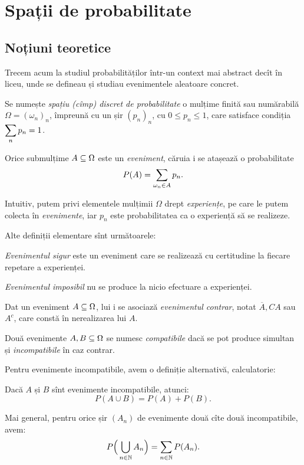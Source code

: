 
\chapter{Spații de probabilitate}

\section{Noțiuni teoretice}

\indent\indent Trecem acum la studiul probabilităților într-un context mai abstract
decît în liceu, unde se defineau și studiau evenimentele aleatoare concret.

\begin{definition}\label{def:spatiu-discret-prob}
  Se numește \emph{spațiu (cîmp) discret de probabilitate} o mulțime finită sau numărabilă
  $ \Omega = (\omega_n)_n $, împreună cu un șir $ (p_n)_n $, cu $ 0 \leq p_n \leq 1 $,
  care satisface condiția $ \displaystyle\sum_n p_n = 1 $.

  Orice submulțime $ A \subseteq \Omega $ este un \emph{eveniment}, căruia i se atașează
  o probabilitate
  \[
    P(A) = \displaystyle\sum_{\omega_n \in A} p_n.
  \]
\end{definition}

Intuitiv, putem privi elementele mulțimii $ \Omega $ drept \emph{experiențe}, pe
care le putem colecta în \emph{evenimente}, iar $ p_n $ este probabilitatea ca o
experiență să se realizeze.

Alte definiții elementare sînt următoarele:

\begin{definition}\label{def:evenimente}
  \emph{Evenimentul sigur} este un eveniment care se realizează cu certitudine la
  fiecare repetare a experienței.

  \emph{Evenimentul imposibil} nu se produce la nicio efectuare a experienței.

  Dat un eveniment $ A \subseteq \Omega $, lui i se asociază \emph{evenimentul contrar},
  notat $ \overline{A}, CA $ sau $ A^c $, care constă în nerealizarea lui $ A $.

  Două evenimente $ A, B \subseteq \Omega $ se numesc \emph{compatibile} dacă se
  pot produce simultan și \emph{incompatibile} în caz contrar.
\end{definition}

Pentru evenimente incompatibile, avem o definiție alternativă, calculatorie:

\begin{definition}\label{def:ev-compat}
  Dacă $ A $ și $ B $ sînt evenimente incompatibile, atunci:
  \[
    P(A \cup B) = P(A) + P(B).
  \]

  Mai general, pentru orice șir $ (A_n) $ de evenimente două cîte două incompatibile,
  avem:
  \[
    P \Big( \bigcup_{n \in \mathbb{N}} A_n \Big) = \sum_{n \in \mathbb{N}} P(A_n).
  \]
\end{definition}

